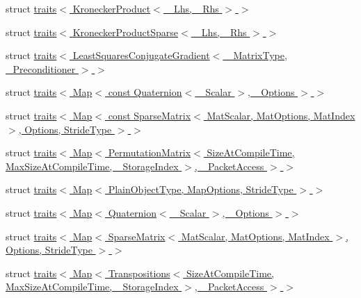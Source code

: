 \begin{DoxyCompactItemize}
\item 
struct \hyperlink{struct_eigen_1_1internal_1_1traits_3_01_kronecker_product_3_01___lhs_00_01___rhs_01_4_01_4}{traits$<$ Kronecker\+Product$<$ \+\_\+\+Lhs, \+\_\+\+Rhs $>$ $>$}
\item 
struct \hyperlink{struct_eigen_1_1internal_1_1traits_3_01_kronecker_product_sparse_3_01___lhs_00_01___rhs_01_4_01_4}{traits$<$ Kronecker\+Product\+Sparse$<$ \+\_\+\+Lhs, \+\_\+\+Rhs $>$ $>$}
\item 
struct \hyperlink{struct_eigen_1_1internal_1_1traits_3_01_least_squares_conjugate_gradient_3_01___matrix_type_00_01___preconditioner_01_4_01_4}{traits$<$ Least\+Squares\+Conjugate\+Gradient$<$ \+\_\+\+Matrix\+Type, \+\_\+\+Preconditioner $>$ $>$}
\item 
struct \hyperlink{struct_eigen_1_1internal_1_1traits_3_01_map_3_01const_01_quaternion_3_01___scalar_01_4_00_01___options_01_4_01_4}{traits$<$ Map$<$ const Quaternion$<$ \+\_\+\+Scalar $>$, \+\_\+\+Options $>$ $>$}
\item 
struct \hyperlink{struct_eigen_1_1internal_1_1traits_3_01_map_3_01const_01_sparse_matrix_3_01_mat_scalar_00_01_matec7066c11e5361dce6e4102c84e4bcd2}{traits$<$ Map$<$ const Sparse\+Matrix$<$ Mat\+Scalar, Mat\+Options, Mat\+Index $>$, Options, Stride\+Type $>$ $>$}
\item 
struct \hyperlink{struct_eigen_1_1internal_1_1traits_3_01_map_3_01_permutation_matrix_3_01_size_at_compile_time_0013e0044a37b24d59a079ebbe4c707a56}{traits$<$ Map$<$ Permutation\+Matrix$<$ Size\+At\+Compile\+Time, Max\+Size\+At\+Compile\+Time, \+\_\+\+Storage\+Index $>$, \+\_\+\+Packet\+Access $>$ $>$}
\item 
struct \hyperlink{struct_eigen_1_1internal_1_1traits_3_01_map_3_01_plain_object_type_00_01_map_options_00_01_stride_type_01_4_01_4}{traits$<$ Map$<$ Plain\+Object\+Type, Map\+Options, Stride\+Type $>$ $>$}
\item 
struct \hyperlink{struct_eigen_1_1internal_1_1traits_3_01_map_3_01_quaternion_3_01___scalar_01_4_00_01___options_01_4_01_4}{traits$<$ Map$<$ Quaternion$<$ \+\_\+\+Scalar $>$, \+\_\+\+Options $>$ $>$}
\item 
struct \hyperlink{struct_eigen_1_1internal_1_1traits_3_01_map_3_01_sparse_matrix_3_01_mat_scalar_00_01_mat_optionsc906e4e1b3a968ac003455586a92664c}{traits$<$ Map$<$ Sparse\+Matrix$<$ Mat\+Scalar, Mat\+Options, Mat\+Index $>$, Options, Stride\+Type $>$ $>$}
\item 
struct \hyperlink{struct_eigen_1_1internal_1_1traits_3_01_map_3_01_transpositions_3_01_size_at_compile_time_00_01_1a60846531a8bf67fbbfd4180820bbd1}{traits$<$ Map$<$ Transpositions$<$ Size\+At\+Compile\+Time, Max\+Size\+At\+Compile\+Time, \+\_\+\+Storage\+Index $>$, \+\_\+\+Packet\+Access $>$ $>$}

\end{DoxyCompactItemize}
